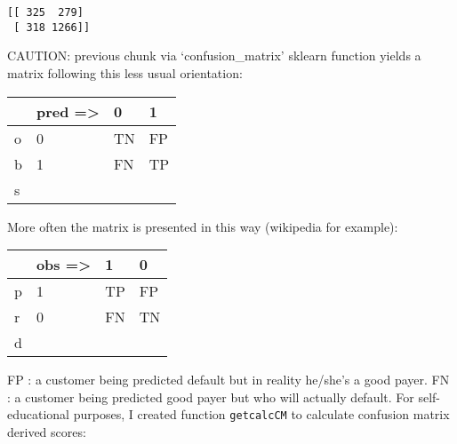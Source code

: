 \documentclass[11pt]{article}
\begin{document}
    \begin{Verbatim}[commandchars=\\\{\}]
[[ 325  279]
 [ 318 1266]]
    \end{Verbatim}

    CAUTION: previous chunk via `confusion\_matrix' sklearn function yields
a matrix following this less usual orientation:

\begin{longtable}[]{@{}llll@{}}
\toprule
& pred =\textgreater{} & 0 & 1\tabularnewline
\midrule
\endhead
o & 0 & TN & FP\tabularnewline
b & 1 & FN & TP\tabularnewline
s & & &\tabularnewline
\bottomrule
\end{longtable}

More often the matrix is presented in this way (wikipedia for example):

\begin{longtable}[]{@{}llll@{}}
\toprule
& obs =\textgreater{} & 1 & 0\tabularnewline
\midrule
\endhead
p & 1 & TP & FP\tabularnewline
r & 0 & FN & TN\tabularnewline
d & & &\tabularnewline
\bottomrule
\end{longtable}

FP : a customer being predicted default but in reality he/she's a good
payer. FN : a customer being predicted good payer but who will actually
default. For self-educational purposes, I created function
\texttt{getcalcCM} to calculate confusion matrix derived scores:
\end{document}
